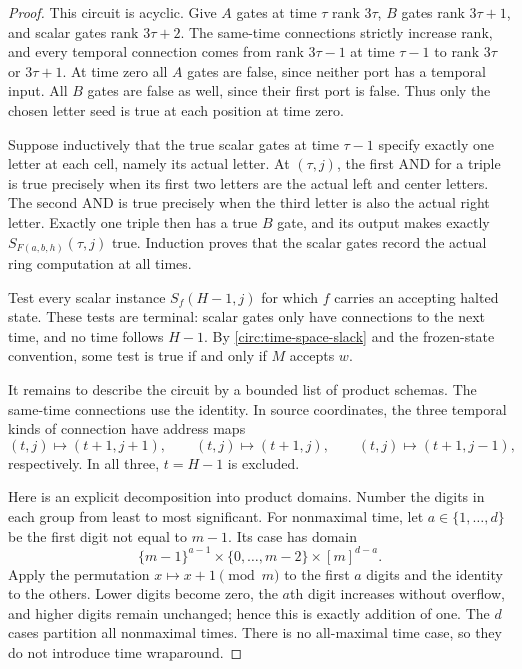 \begin{proof}
This circuit is acyclic. Give $A$ gates at time $\tau$ rank $3\tau$,
$B$ gates rank $3\tau+1$, and scalar gates rank $3\tau+2$. The same-time
connections strictly increase rank, and every temporal connection comes
from rank $3\tau-1$ at time $\tau-1$ to rank $3\tau$ or $3\tau+1$.
At time zero all $A$ gates are false, since neither port has a temporal
input. All $B$ gates are false as well, since their first port is false.
Thus only the chosen letter seed is true at each position at time zero.

Suppose inductively that the true scalar gates at time $\tau-1$ specify
exactly one letter at each cell, namely its actual letter. At $(\tau,j)$,
the first AND for a triple is true precisely when its first two letters are
the actual left and center letters. The second AND is true precisely when
the third letter is also the actual right letter. Exactly one triple then
has a true $B$ gate, and its output makes exactly
$S_{F(a,b,h)}(\tau,j)$ true. Induction proves that the scalar gates record
the actual ring computation at all times.

Test every scalar instance $S_f(H-1,j)$ for which $f$ carries an accepting
halted state. These tests are terminal: scalar gates only have connections
to the next time, and no time follows $H-1$. By
\eqref{circ:time-space-slack} and the frozen-state convention, some test is
true if and only if $M$ accepts $w$.

It remains to describe the circuit by a bounded list of product schemas.
The same-time connections use the identity. In source coordinates, the
three temporal kinds of connection have address maps
\begin{equation}
\label{circ:temporal-maps}
 (t,j)\longmapsto(t+1,j+1),\qquad
 (t,j)\longmapsto(t+1,j),\qquad
 (t,j)\longmapsto(t+1,j-1),
\end{equation}
respectively. In all three, $t=H-1$ is excluded.

Here is an explicit decomposition into product domains. Number the digits
in each group from least to most significant. For nonmaximal time, let
$a\in\{1,\ldots,d\}$ be the first digit not equal to $m-1$. Its case has
domain
\[
 \{m-1\}^{a-1}\times\{0,\ldots,m-2\}\times[m]^{d-a}.
\]
Apply the permutation $x\mapsto x+1\pmod m$ to the first $a$ digits and
the identity to the others. Lower digits become zero, the $a$th digit
increases without overflow, and higher digits remain unchanged; hence this
is exactly addition of one. The $d$ cases partition all nonmaximal times.
There is no all-maximal time case, so they do not introduce time wraparound.


\end{proof}

